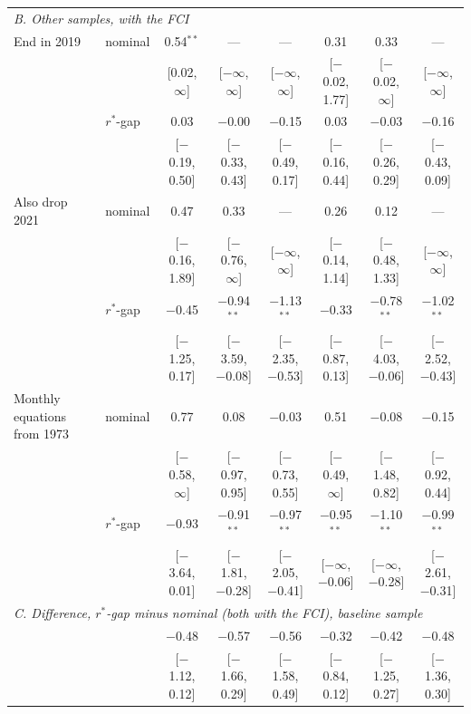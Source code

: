 \begin{tabular}{llcccccc}
\midrule
\multicolumn{8}{l}{\textit{B. Other samples, with the FCI}}\\
End in 2019 & nominal & 0.54$^{**}$ & --- & --- & 0.31 & 0.33 & --- \\
 &  & {\scriptsize [0.02, $\infty$]} & {\scriptsize [$-\infty$, $\infty$]} & {\scriptsize [$-\infty$, $\infty$]} & {\scriptsize [$-$0.02, 1.77]} & {\scriptsize [$-$0.02, $\infty$]} & {\scriptsize [$-\infty$, $\infty$]} \\[2pt]
 & $r^*$-gap & 0.03 & $-$0.00 & $-$0.15 & 0.03 & $-$0.03 & $-$0.16 \\
 &  & {\scriptsize [$-$0.19, 0.50]} & {\scriptsize [$-$0.33, 0.43]} & {\scriptsize [$-$0.49, 0.17]} & {\scriptsize [$-$0.16, 0.44]} & {\scriptsize [$-$0.26, 0.29]} & {\scriptsize [$-$0.43, 0.09]} \\[2pt]
Also drop 2021 & nominal & 0.47 & 0.33 & --- & 0.26 & 0.12 & --- \\
 &  & {\scriptsize [$-$0.16, 1.89]} & {\scriptsize [$-$0.76, $\infty$]} & {\scriptsize [$-\infty$, $\infty$]} & {\scriptsize [$-$0.14, 1.14]} & {\scriptsize [$-$0.48, 1.33]} & {\scriptsize [$-\infty$, $\infty$]} \\[2pt]
 & $r^*$-gap & $-$0.45 & $-$0.94$^{**}$ & $-$1.13$^{**}$ & $-$0.33 & $-$0.78$^{**}$ & $-$1.02$^{**}$ \\
 &  & {\scriptsize [$-$1.25, 0.17]} & {\scriptsize [$-$3.59, $-$0.08]} & {\scriptsize [$-$2.35, $-$0.53]} & {\scriptsize [$-$0.87, 0.13]} & {\scriptsize [$-$4.03, $-$0.06]} & {\scriptsize [$-$2.52, $-$0.43]} \\[2pt]
Monthly equations from 1973 & nominal & 0.77 & 0.08 & $-$0.03 & 0.51 & $-$0.08 & $-$0.15 \\
 &  & {\scriptsize [$-$0.58, $\infty$]} & {\scriptsize [$-$0.97, 0.95]} & {\scriptsize [$-$0.73, 0.55]} & {\scriptsize [$-$0.49, $\infty$]} & {\scriptsize [$-$1.48, 0.82]} & {\scriptsize [$-$0.92, 0.44]} \\[2pt]
 & $r^*$-gap & $-$0.93 & $-$0.91$^{**}$ & $-$0.97$^{**}$ & $-$0.95$^{**}$ & $-$1.10$^{**}$ & $-$0.99$^{**}$ \\
 &  & {\scriptsize [$-$3.64, 0.01]} & {\scriptsize [$-$1.81, $-$0.28]} & {\scriptsize [$-$2.05, $-$0.41]} & {\scriptsize [$-\infty$, $-$0.06]} & {\scriptsize [$-\infty$, $-$0.28]} & {\scriptsize [$-$2.61, $-$0.31]} \\[2pt]
\midrule
\multicolumn{8}{l}{\textit{C. Difference, $r^*$-gap minus nominal (both with the FCI), baseline sample}}\\
 &  & $-$0.48 & $-$0.57 & $-$0.56 & $-$0.32 & $-$0.42 & $-$0.48 \\
 &  & {\scriptsize [$-$1.12, 0.12]} & {\scriptsize [$-$1.66, 0.29]} & {\scriptsize [$-$1.58, 0.49]} & {\scriptsize [$-$0.84, 0.12]} & {\scriptsize [$-$1.25, 0.27]} & {\scriptsize [$-$1.36, 0.30]} \\[2pt]
\bottomrule
\end{tabular}
